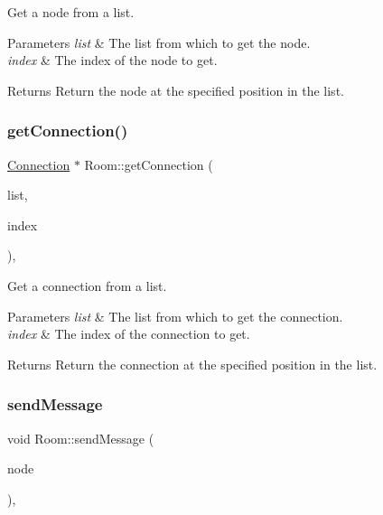 Get a node from a list. 


\begin{DoxyParams}{Parameters}
{\em list} & The list from which to get the node. \\
\hline
{\em index} & The index of the node to get. \\
\hline
\end{DoxyParams}
\begin{DoxyReturn}{Returns}
Return the node at the specified position in the list. 
\end{DoxyReturn}
\mbox{\label{classRoom_a5a32e38ec8c82987fb99e70106ed6fdc}} 
\subsubsection{\texorpdfstring{get\+Connection()}{getConnection()}}
{\footnotesize\ttfamily \mbox{\hyperlink{classConnection}{Connection}} $\ast$ Room\+::get\+Connection (\begin{DoxyParamCaption}\item[{Q\+Qml\+List\+Property$<$ \mbox{\hyperlink{classConnection}{Connection}} $>$ $\ast$}]{list,  }\item[{int}]{index }\end{DoxyParamCaption})\hspace{0.3cm}{\ttfamily [static]}, {\ttfamily [private]}}



Get a connection from a list. 


\begin{DoxyParams}{Parameters}
{\em list} & The list from which to get the connection. \\
\hline
{\em index} & The index of the connection to get. \\
\hline
\end{DoxyParams}
\begin{DoxyReturn}{Returns}
Return the connection at the specified position in the list. 
\end{DoxyReturn}
\mbox{\label{classRoom_a3abfcc9def908c1a0acaf286fc325454}} 
\subsubsection{\texorpdfstring{send\+Message}{sendMessage}}
{\footnotesize\ttfamily void Room\+::send\+Message (\begin{DoxyParamCaption}\item[{\mbox{\hyperlink{classNode}{Node}} $\ast$}]{node }\end{DoxyParamCaption})\hspace{0.3cm}{\ttfamily [private]}, {\ttfamily [slot]}}



